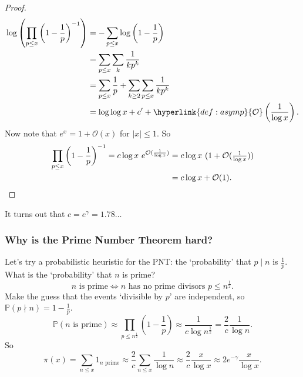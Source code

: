 \documentclass{article}
\newcommand{\bigO}{\mathcal{O}}
\begin{document}
\begin{proof}
  \begin{align*}
    \log \left(\prod_{p \leq x} \left(1 - \frac{1}{p}\right)^{-1}\right) &= - \sum_{p \leq x} \log \left(1 - \frac{1}{p}\right) \\
                                                                         &= \sum_{p \leq x} \sum_{k} \frac{1}{k p^k} \\
                                                                         &= \sum_{p \leq x} \frac 1p + \sum_{k \geq 2} \sum_{p \leq x} \frac{1}{k p^k} \\
                                                                         &= \log \log x + c' + \hyperlink{def:asymp}{\bigO}\left(\frac{1}{\log x}\right).
  \end{align*}
  Now note that $e^x = 1 + \bigO(x)$ for $|x| \leq 1$.
  So
  \begin{align*}
    \prod_{p \leq x} \left(1 - \frac{1}{p}\right)^{-1} = c \log x\ e^{\bigO(\frac{1}{\log x})} &= c \log x\ (1 + \bigO(\tfrac{1}{\log x})) \\
                                                                                            &= c \log x + \bigO(1). \qedhere
  \end{align*}
\end{proof}
It turns out that $c = e^\gamma = 1.78\dots$

\subsubsection{Why is the Prime Number Theorem hard?}
Let's try a probabilistic heuristic for the PNT: the `probability' that $p \mid n$ is $\frac{1}{p}$.
What is the `probability' that $n$ is prime?
\begin{equation*}
  n\text{ is prime} \iff n\text{ has no prime divisors } p \leq n^{\frac{1}{2}}.
\end{equation*}
Make the guess that the events `divisible by $p$' are independent, so $\mathbb{P}(p \nmid n) = 1 - \frac{1}{p}$.
\begin{equation*}
  \mathbb{P}(n \text{ is prime}) \approx \prod_{p \leq n^{\frac{1}{2}}} \left(1 - \frac{1}{p}\right) \approx \frac{1}{c \log n^{\frac{1}{2}}} = \frac{2}{c} \frac{1}{\log n}.
\end{equation*}
So
\begin{equation*}
\pi(x) = \sum_{n \leq x} 1_{n \text{ prime}} \approx \frac{2}{c} \sum_{n \leq x} \frac{1}{\log n} \approx \frac{2}{c} \frac{x}{\log x} \approx 2 e^{-\gamma} \frac{x}{\log x}.
\end{equation*}
\end{document}
